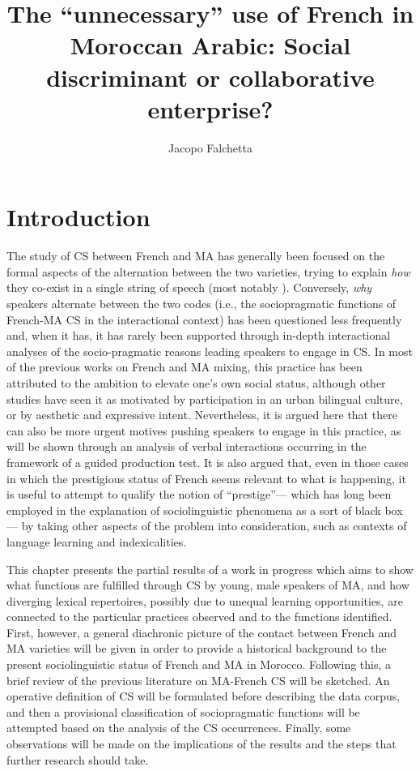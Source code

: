 \documentclass[output=paper]{langscibook}
\author{Jacopo Falchetta \orcid{0000-0002-0467-9079} \affiliation{University of Bergamo and IREMAM, Aix-en-Provence}}
\title[The ``unnecessary'' use of French in Moroccan Arabic]{The ``unnecessary'' use of French in Moroccan Arabic: Social discriminant or
collaborative enterprise?}
\begin{document}
\maketitle

\section{Introduction}
The study of \gls*{CS} between French and \gls*{MA} has generally been focused on the formal aspects of the alternation between the two varieties, trying to explain \textit{how} they co-exist in a single string of speech (most notably \citealt{bentahila_syntax_1983,bentahila_patterns_1995, lahlou_morpho-syntactic_1991, ziamari_development_2007, ziamari_moroccan_2009,ziamari_determiner_2018}). Conversely, \textit{why} speakers alternate between the two codes (i.e., the sociopragmatic functions of French-\gls*{MA} \gls*{CS} in the interactional context) has been questioned less frequently and, when it has, it has rarely been supported through in-depth interactional analyses of the socio-pragmatic reasons leading speakers to engage in \gls*{CS}. In most of the previous works on French and \gls*{MA} mixing, this practice has been attributed to the ambition to elevate one’s own social status, although other studies have seen it as motivated by participation in an urban bilingual culture, or by aesthetic and expressive intent. Nevertheless, it is argued here that there can also be more urgent motives pushing speakers to engage in this practice, as will be shown through an analysis of verbal interactions occurring in the framework of a guided production test. It is also argued that, even in those cases in which the prestigious status of French seems relevant to what is happening, it is useful to attempt to qualify the notion of ``prestige''— which has long been employed in the explanation of sociolinguistic phenomena as a sort of black box — by taking other aspects of the problem into consideration, such as contexts of language learning and indexicalities.


This chapter presents the partial results of a work in progress which aims to show what functions are fulfilled through \gls*{CS} by young, male speakers of \gls*{MA}, and how diverging lexical repertoires, possibly due to unequal learning opportunities, are connected to the particular practices observed and to the functions identified. First, however, a general diachronic picture of the contact between French and \gls*{MA} varieties will be given in order to provide a historical background to the present sociolinguistic status of French and \gls*{MA} in Morocco. Following this, a brief review of the previous literature on \gls*{MA}-French \gls*{CS} will be sketched. An operative definition of \gls*{CS} will be formulated before describing the data corpus, and then a provisional classification of sociopragmatic functions will be attempted based on the analysis of the \gls*{CS} occurrences. Finally, some observations will be made on the implications of the results and the steps that further research should take.
\end{document}
